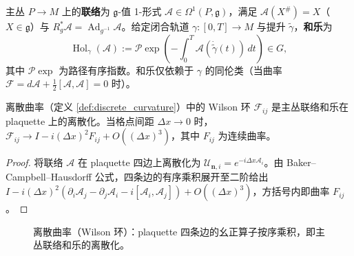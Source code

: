 \begin{definition}[联络与和乐]\label{def:connection_holonomy}
主丛 $P\to M$ 上的\textbf{联络}为 $\mathfrak{g}$-值 1-形式 $\mathcal{A}\in\Omega^1(P,\mathfrak{g})$，满足 $\mathcal{A}(X^\#)=X$（$X\in\mathfrak{g}$）与 $R_g^*\mathcal{A}=\operatorname{Ad}_{g^{-1}}\mathcal{A}$。给定闭合轨道 $\gamma:[0,T]\to M$ 与提升 $\tilde\gamma$，\textbf{和乐}为
\[
\operatorname{Hol}_\gamma(\mathcal{A}):=\mathcal{P}\exp\!\left(-\int_0^T\mathcal{A}(\dot{\tilde\gamma}(t))\,dt\right)\in G,
\]
其中 $\mathcal{P}\exp$ 为路径有序指数。和乐仅依赖于 $\gamma$ 的同伦类（当曲率 $\mathcal{F}=d\mathcal{A}+\tfrac12[\mathcal{A},\mathcal{A}]=0$ 时）。
\end{definition}

\begin{proposition}\label{prop:wilson_holonomy}
离散曲率（定义 \ref{def:discrete_curvature}）中的 Wilson 环 $\mathcal{F}_{ij}$ 是主丛联络和乐在 plaquette 上的离散化。当格点间距 $\Delta x\to 0$ 时，$\mathcal{F}_{ij}\to I-i(\Delta x)^2 F_{ij}+O((\Delta x)^3)$，其中 $F_{ij}$ 为连续曲率。
\end{proposition}

\begin{proof}
将联络 $\mathcal{A}$ 在 plaquette 四边上离散化为 $\mathcal{U}_{\mathbf{n},i}=e^{-i\Delta x\mathcal{A}_i}$。由 Baker--Campbell--Hausdorff 公式，四条边的有序乘积展开至二阶给出 $I-i(\Delta x)^2(\partial_i\mathcal{A}_j-\partial_j\mathcal{A}_i-i[\mathcal{A}_i,\mathcal{A}_j])+O((\Delta x)^3)$，方括号内即曲率 $F_{ij}$。
\end{proof}

\begin{figure}[htbp]
\centering
{}
\caption{离散曲率（Wilson 环）：plaquette 四条边的幺正算子按序乘积，即主丛联络和乐的离散化。}
\label{fig:wilson_loop}
\end{figure}

